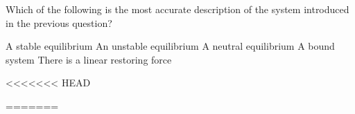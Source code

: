 \documentclass{../../oss-apphys-exam}
\begin{document}
\begin{multicols*}{2}
\begin{questions}
\begin{questions}
{    \question Which of the following is the most accurate description of the
    system introduced in the previous question?
    \label{q:well2}
    \begin{choices}
      \choice A stable equilibrium
      \choice An unstable equilibrium
      \choice A neutral equilibrium
      \choice A bound system
      \choice There is a linear restoring force
    \end{choices}
    \vspace{.7in}
    
<<<<<<< HEAD

=======
    
}
\end{questions}
\end{questions}
\end{multicols*}
\end{document}
